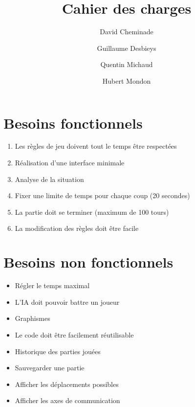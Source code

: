 \documentclass[12pt]{article}
\title{Cahier des charges}
\author{
	David Cheminade
	\and
	Guillaume Desbieys
	\and
	Quentin Michaud
	\and
	Hubert Mondon
}
\date{}
\begin{document}
 
	\maketitle{}                             

	\section{Besoins fonctionnels}    


		\begin{enumerate}
			\item Les règles de jeu doivent tout le temps être respectées
			\item Réalisation d'une interface minimale
			\item Analyse de la situation
			\item Fixer une limite de temps pour chaque coup (20 secondes)
			\item La partie doit se terminer (maximum de 100 tours)
			\item La modification des règles doit être facile
		\end{enumerate}

	\section{Besoins non fonctionnels} 

		\begin{itemize}
			\item Régler le temps maximal
			\item L'IA doit pouvoir battre un joueur
			\item Graphismes
			\item Le code doit être facilement réutilisable
			\item Historique des parties jouées
			\item Sauvegarder une partie
			\item Afficher les déplacements possibles
			\item Afficher les axes de communication
		\end{itemize}

	
\end{document}
